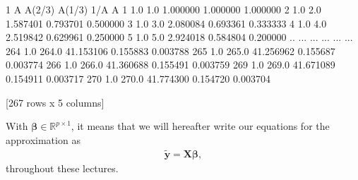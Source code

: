 \documentclass[letterpaper,10pt,english]{sphinxmanual}
\begin{document}
\begin{sphinxVerbatim}[commandchars=\\\{\}]
       1      A    A\PYGZca{}(2/3)  A\PYGZca{}(\PYGZhy{}1/3)       1/A
A                                             
1    1.0    1.0   1.000000  1.000000  1.000000
2    1.0    2.0   1.587401  0.793701  0.500000
3    1.0    3.0   2.080084  0.693361  0.333333
4    1.0    4.0   2.519842  0.629961  0.250000
5    1.0    5.0   2.924018  0.584804  0.200000
..   ...    ...        ...       ...       ...
264  1.0  264.0  41.153106  0.155883  0.003788
265  1.0  265.0  41.256962  0.155687  0.003774
266  1.0  266.0  41.360688  0.155491  0.003759
269  1.0  269.0  41.671089  0.154911  0.003717
270  1.0  270.0  41.774300  0.154720  0.003704

[267 rows x 5 columns]
\end{sphinxVerbatim}

With \(\boldsymbol{\beta}\in {\mathbb{R}}^{p\times 1}\), it means that we will hereafter write our equations for the approximation as
\begin{equation*}
\begin{split}
\boldsymbol{\tilde{y}}= \boldsymbol{X}\boldsymbol{\beta},
\end{split}
\end{equation*}
throughout these lectures.
\end{document}
